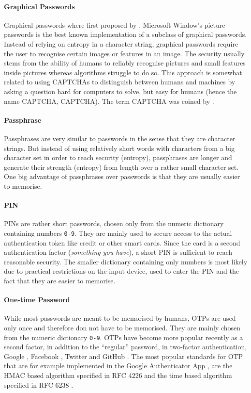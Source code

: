 \paragraph{Graphical Passwords}
Graphical passwords where first proposed by \citet{Blonder96}. 
Microsoft Window's picture passwords \cite{picturepwd1,picturepwd2} is the best known implementation of a subclass of graphical passwords.
Instead of relying on entropy in a character string, graphical passwords require the user to recognise certain images or features in an image.
The security usually stems from the ability of humans to reliably recognise pictures and small features inside pictures whereas algorithms struggle to do so.
This approach is somewhat related to using \acsp{CAPTCHA} to distinguish between humans and machines by asking a question hard for computers to solve, but easy for humans (hence the name \ac{CAPTCHA}, \acl{CAPTCHA}).
The term \ac{CAPTCHA} was coined by \citet{AhnBHL03}.

\paragraph{Passphrase}
Passphrases are very similar to passwords in the sense that they are character strings.
But instead of using relatively short words with characters from a big character set in order to reach security (entropy), passphrases are longer and generate their strength (entropy) from length over a rather small character set.
One big advantage of passphrases over passwords is that they are usually easier to memorise.

\paragraph{\acl{PIN}}
\acp{PIN} are rather short passwords, chosen only from the numeric dictionary containing numbers \texttt{0-9}.
They are mainly used to secure access to the actual authentication token like credit or other smart cards.
Since the card is a second authentication factor (\emph{something you have}), a short \ac{PIN} is sufficient to reach reasonable security.
The smaller dictionary containing only numbers is most likely due to practical restrictions on the input device, used to enter the \ac{PIN} and the fact that they are easier to memorise.

\paragraph{One-time Password}
While most passwords are meant to be memorised by humans, \acp{OTP} are used only once and therefore don not have to be memorised.
They are mainly chosen from the numeric dictionary \texttt{0-9}.
\acp{OTP} have become more popular recently as a second factor, in addition to the ``regular'' password, in two-factor authentication, \eg Google \cite{Google2Factor}, Facebook \cite{FB2Factor}, Twitter \cite{Twitter2Factor} and GitHub \cite{Github2Factor}.
The most popular standards for \ac{OTP} that are for example implemented in the Google Authenticator App \cite{GAuthenticator}, are the \acs{HMAC} based algorithm specified in RFC 4226 \cite{rfc4226} and the time based algorithm specified in RFC 6238 \cite{rfc6238}.

